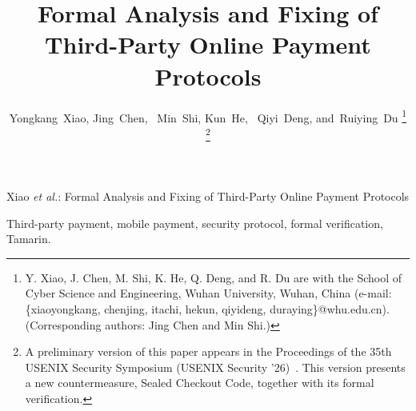 \documentclass[journal]{IEEEtran}
\begin{document}

\title{Formal Analysis and Fixing of Third-Party Online Payment Protocols}

\author{Yongkang~Xiao,
        Jing~Chen,~
        Min~Shi,
        Kun~He,~
        Qiyi~Deng,
        and~Ruiying~Du%
\thanks{Y. Xiao, J. Chen, M. Shi, K. He, Q. Deng, and R. Du are with the School of Cyber Science and Engineering, Wuhan University, Wuhan, China (e-mail: \{xiaoyongkang, chenjing, itachi, hekun, qiyideng, duraying\}@whu.edu.cn). (Corresponding authors: Jing Chen and Min Shi.)}%
\thanks{A preliminary version of this paper appears in the Proceedings of the 35th USENIX Security Symposium (USENIX Security '26)~\cite{xiao2026authorization}. This version presents a new countermeasure, Sealed Checkout Code, together with its formal verification.}}

%
{Xiao \MakeLowercase{\textit{et al.}}: Formal Analysis and Fixing of Third-Party Online Payment Protocols}

\maketitle


\begin{IEEEkeywords}
Third-party payment, mobile payment, security protocol, formal verification, Tamarin.
\end{IEEEkeywords}




















\end{document}
